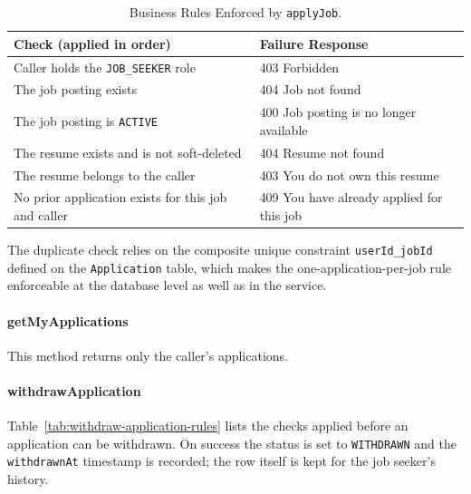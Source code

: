 \begin{table}[H]
	\centering
	\caption{Business Rules Enforced by \texttt{applyJob}.}
	\label{tab:apply-job-rules}
	\begin{tabular}{|p{7.2cm}|p{6.8cm}|}
		\hline
		\textbf{Check (applied in order)} & \textbf{Failure Response} \\
		\hline
		Caller holds the \texttt{JOB\_SEEKER} role & 403 Forbidden \\
		\hline
		The job posting exists & 404 Job not found \\
		\hline
		The job posting is \texttt{ACTIVE} & 400 Job posting is no longer available \\
		\hline
		The resume exists and is not soft-deleted & 404 Resume not found \\
		\hline
		The resume belongs to the caller & 403 You do not own this resume \\
		\hline
		No prior application exists for this job and caller & 409 You have already applied for this job \\
		\hline
	\end{tabular}
\end{table}

The duplicate check relies on the composite unique constraint \texttt{userId\_jobId} defined on the \texttt{Application} table, which makes the one-application-per-job rule enforceable at the database level as well as in the service.

\paragraph{getMyApplications}
This method returns only the caller's applications.

\paragraph{withdrawApplication}
Table~\ref{tab:withdraw-application-rules} lists the checks applied before an application can be withdrawn. On success the status is set to \texttt{WITHDRAWN} and the \texttt{withdrawnAt} timestamp is recorded; the row itself is kept for the job seeker's history.

